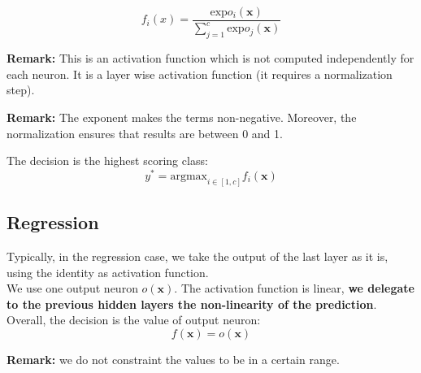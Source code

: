 \begin{equation}
    f_i(x) = \frac{\text{exp}o_i(\pmb{x})}{\sum_{j=1}^c \text{exp} o_j(\pmb{x})}
\end{equation}

\textbf{Remark:} This is an activation function which is not computed independently for each neuron. It is a layer wise activation function (it requires a normalization step). \newline

\textbf{Remark:} The exponent makes the terms non-negative. Moreover, the normalization ensures that results are between 0 and 1. \newline

The decision is the highest scoring class:
\begin{equation}
    y^* = \text{argmax}_{i \in [1,c]} f_i(\pmb{x})
\end{equation}

\subsection{Regression}
Typically, in the regression case, we take the output of the last layer as it is, using the identity as activation function. \\
We use one output neuron $o(\pmb{x})$. The activation function is linear, \textbf{we delegate to the previous hidden layers the non-linearity of the prediction}. Overall, the decision is the value of output neuron:
\begin{equation}
    f(\pmb{x}) = o(\pmb{x})
\end{equation}

\textbf{Remark:} we do not constraint the values to be in a certain range.

